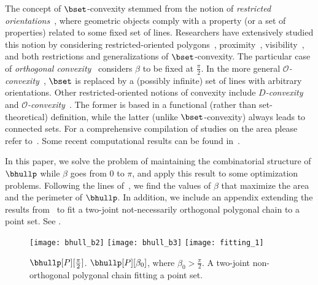 \documentclass[11pt,letterpaper,english]{article}
\theoremstyle{definition}
\begin{document}
The concept of $\bset$-convexity stemmed from the notion of
\emph{restricted orientations}~\cite{guting_thesis_1983}, where
geometric objects comply with a property (or a set of properties)
related to some fixed set of lines. Researchers have extensively
studied this notion by considering restricted-oriented
polygons~\cite{guting_thesis_1983}, proximity~\cite{widmayer_1987},
visibility~\cite{schuierer_thesis_1991}, and both restrictions and
generalizations of $\bset$-convexity. The particular case of
\emph{orthogonal convexity}~\cite{rawlins_1988} considers $\beta$ to
be fixed at $\frac{\pi}{2}$. In the more general
\emph{$\mathcal{O}$-convexity}~\cite{rawlins_1987,rawlins_1988},
$\bset$ is replaced by a (possibly infinite) set of lines with
arbitrary orientations. Other restricted-oriented notions of convexity
include \emph{$D$-convexity}~\cite{franek_2009} and
\emph{$\mathcal{O}$-convexity}~\cite{rawlins_thesis_1987}. The former
is based in a functional (rather than set-theoretical) definition,
while the latter (unlike $\bset$-convexity) always leads to connected
sets. For a comprehensive compilation of studies on the area please
refer to~\citet{fink_2004}. Some recent computational results can be
found in~\cite{minimum-area_2012,alegria_2013,alegria_2014,pelaez_2013}.

In this paper, we solve the problem of maintaining the combinatorial structure
of $\bhullp$ while $\beta$ goes from $0$ to $\pi$, and apply
this result to some optimization problems. Following the lines
of~\citet{bae_2009}, we find the values of $\beta$ that maximize the
area and the perimeter of $\bhullp$. In addition, we include an appendix extending the results
from~\citet{fitting_2011} to fit a two-joint not-necessarily orthogonal polygonal
chain to a point set. See .

\begin{figure}[ht]
  \centering
  \subcaptionbox{\label{bhull:fig:optim:1}}
  {\texttt{[image: bhull\_b2]}}
\hspace{-0.2cm}
  \subcaptionbox{\label{bhull:fig:optim:2}}
  {\texttt{[image: bhull\_b3]}}
\hspace{-0.4cm}
  \subcaptionbox{\label{bhull:fig:optim:3}}
  {\texttt{[image: fitting\_1]}}
  \caption{
    $\bhullp[P][\frac{\pi}{2}]$. 
    $\bhullp[P][\beta_0]$, where $\beta_0 > \frac{\pi}{2}$.
     A two-joint non-orthogonal polygonal
    chain fitting a point set.}
  \label{intro:fig:optim}
\end{figure}
\end{document}
